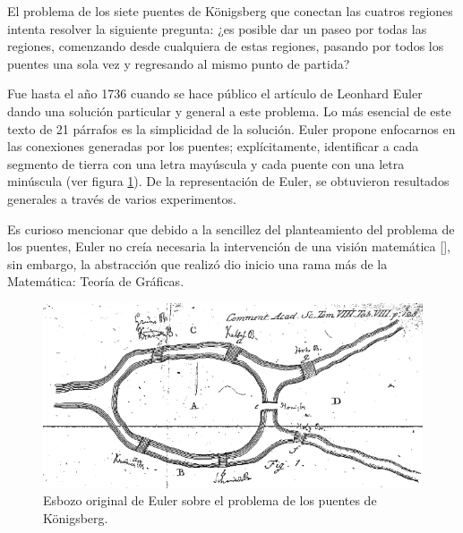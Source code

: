 \documentclass[../main.tex]{subfiles}
\begin{document}
El problema de los siete puentes de Königsberg que conectan las cuatros regiones intenta resolver la siguiente pregunta:  ¿es posible dar un paseo por todas las regiones,  comenzando desde cualquiera de estas regiones, pasando por todos los puentes una sola vez y regresando al mismo punto de partida? 

Fue hasta el año 1736 cuando se hace público el artículo de Leonhard Euler dando una solución particular y general a este problema. Lo más esencial de este texto de 21 párrafos es la simplicidad de la solución. Euler propone enfocarnos en las conexiones generadas por los puentes; explícitamente, identificar a cada segmento de tierra con una letra mayúscula y cada puente con una letra minúscula (ver figura \ref{fig:marcoteorico_abstracteuler}).   De la representación de Euler, se obtuvieron  resultados generales a través de varios experimentos. 

Es curioso mencionar que debido a la sencillez del planteamiento del problema de los puentes, Euler no creía necesaria la intervención de una visión matemática [\cite{thetrueaboutkonigsberg}], sin embargo, la abstracción que realizó dio inicio una rama más de la Matemática: Teoría de Gráficas. 




\begin{figure}[h!]
    \centering
    \includegraphics[scale = 0.5]{images/marcoteorico_abstract.png}
    \caption{Esbozo original de Euler sobre el problema de los puentes de Königsberg.}
    \label{fig:marcoteorico_abstracteuler}
\end{figure}


\end{document}
